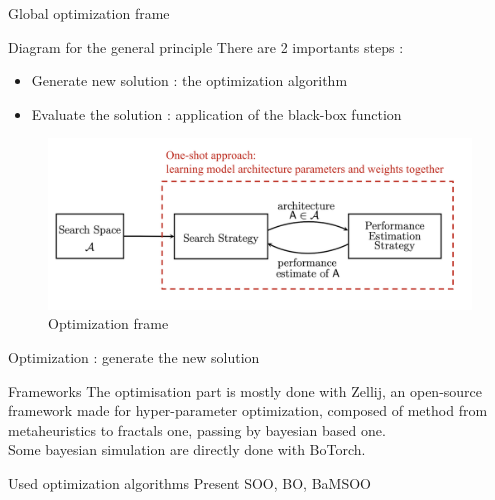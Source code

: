 \begin{frame}{Global optimization frame}
        \begin{block}{Diagram for the general principle}
            There are 2 importants steps : 
            \begin{itemize}
                \item Generate new solution : the optimization algorithm
                \item Evaluate the solution : application of the black-box function
            \end{itemize}
            
        \end{block}
            

            \begin{figure}
                \centering
                \includegraphics[width=0.5\linewidth]{imgs/NAS-high-level.png}
                \caption{Optimization frame}
            \end{figure}
    
\end{frame}

\begin{frame}[allowframebreaks]{Optimization : generate the new solution}
    \begin{block}{Frameworks}
            The optimisation part is mostly done with Zellij, an open-source framework made for hyper-parameter optimization, composed of method from metaheuristics to fractals one, passing by bayesian based one.\\
            Some bayesian simulation are directly done with BoTorch.

        
    \end{block}

    \begin{block}{Used optimization algorithms}
        Present SOO, BO, BaMSOO
        
    \end{block}
\end{frame}



